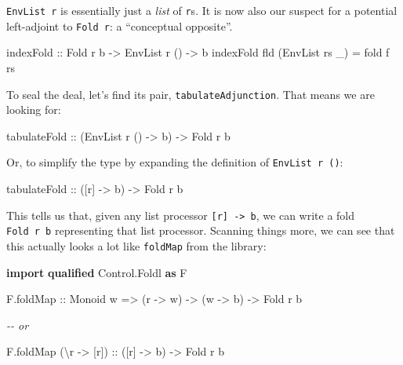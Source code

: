\documentclass[]{article}
\newenvironment{Shaded}{}{}
\newcommand{\CommentTok}[1]{\textcolor[rgb]{0.38,0.63,0.69}{\textit{#1}}}
\newcommand{\DataTypeTok}[1]{\textcolor[rgb]{0.56,0.13,0.00}{#1}}
\newcommand{\KeywordTok}[1]{\textcolor[rgb]{0.00,0.44,0.13}{\textbf{#1}}}
\newcommand{\NormalTok}[1]{#1}
\newcommand{\OtherTok}[1]{\textcolor[rgb]{0.00,0.44,0.13}{#1}}
\begin{document}
\texttt{EnvList\ r} is essentially just a \emph{list} of \texttt{r}s. It is now
also our suspect for a potential left-adjoint to \texttt{Fold\ r}: a
``conceptual opposite''.

\begin{Shaded}
\begin{Highlighting}[]
\OtherTok{indexFold ::} \DataTypeTok{Fold}\NormalTok{ r b }\OtherTok{{-}>} \DataTypeTok{EnvList}\NormalTok{ r () }\OtherTok{{-}>}\NormalTok{ b}
\NormalTok{indexFold fld (}\DataTypeTok{EnvList}\NormalTok{ rs \_) }\OtherTok{=}\NormalTok{ fold f rs}
\end{Highlighting}
\end{Shaded}

To seal the deal, let's find its pair, \texttt{tabulateAdjunction}. That means
we are looking for:

\begin{Shaded}
\begin{Highlighting}[]
\OtherTok{tabulateFold ::}\NormalTok{ (}\DataTypeTok{EnvList}\NormalTok{ r () }\OtherTok{{-}>}\NormalTok{ b) }\OtherTok{{-}>} \DataTypeTok{Fold}\NormalTok{ r b}
\end{Highlighting}
\end{Shaded}

Or, to simplify the type by expanding the definition of \texttt{EnvList\ r\ ()}:

\begin{Shaded}
\begin{Highlighting}[]
\OtherTok{tabulateFold ::}\NormalTok{ ([r] }\OtherTok{{-}>}\NormalTok{ b) }\OtherTok{{-}>} \DataTypeTok{Fold}\NormalTok{ r b}
\end{Highlighting}
\end{Shaded}

This tells us that, given any list processor
\texttt{{[}r{]}\ -\textgreater{}\ b}, we can write a fold \texttt{Fold\ r\ b}
representing that list processor. Scanning things more, we can see that this
actually looks a lot like \texttt{foldMap} from the library:

\begin{Shaded}
\begin{Highlighting}[]
\KeywordTok{import} \KeywordTok{qualified} \DataTypeTok{Control.Foldl} \KeywordTok{as} \DataTypeTok{F}

\NormalTok{F.foldMap}
\OtherTok{    ::} \DataTypeTok{Monoid}\NormalTok{ w}
    \OtherTok{=>}\NormalTok{ (r }\OtherTok{{-}>}\NormalTok{ w)}
    \OtherTok{{-}>}\NormalTok{ (w }\OtherTok{{-}>}\NormalTok{ b)}
    \OtherTok{{-}>} \DataTypeTok{Fold}\NormalTok{ r b}

\CommentTok{{-}{-} or}

\NormalTok{F.foldMap (\textbackslash{}r }\OtherTok{{-}>}\NormalTok{ [r])}
\OtherTok{    ::}\NormalTok{ ([r] }\OtherTok{{-}>}\NormalTok{ b)}
    \OtherTok{{-}>} \DataTypeTok{Fold}\NormalTok{ r b}
\end{Highlighting}
\end{Shaded}
\end{document}
